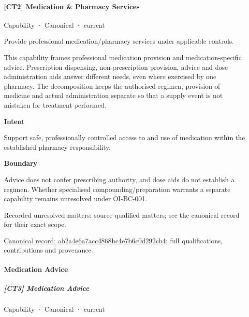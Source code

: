 \paragraph{[CT2] Medication \& Pharmacy Services}

\label{element:ab2a4e6a7acc4868bc4e7b6c0d292cb4}
{\small Capability · Canonical · current}\par

Provide professional medication/pharmacy services under applicable controls.



This capability frames professional medication provision and medication-specific advice. Prescription dispensing, non-prescription provision, advice and dose administration aids answer different needs, even where exercised by one pharmacy. The decomposition keeps the authorised regimen, provision of medicine and actual administration separate so that a supply event is not mistaken for treatment performed.



\textbf{Intent}



Support safe, professionally controlled access to and use of medication within the established pharmacy responsibility.



\textbf{Boundary}



Advice does not confer prescribing authority, and dose aids do not establish a regimen. Whether specialised compounding/preparation warrants a separate capability remains unresolved under OI-BC-001.


{\small Recorded unresolved matters: source-qualified matters; see the canonical record for their exact scope.}\par
{\footnotesize \href{../../../../continuum/strategy/capability/ab2a4e6a7acc4868bc4e7b6c0d292cb4.md}{Canonical record: ab2a4e6a7acc4868bc4e7b6c0d292cb4}; full qualifications, contributions and provenance.}\par
\paragraph{Medication Advice}

\subparagraph{[CT3] Medication Advice}

\label{element:b867a2fde009437196a5fed682abf073}
{\small Capability · Canonical · current}\par

